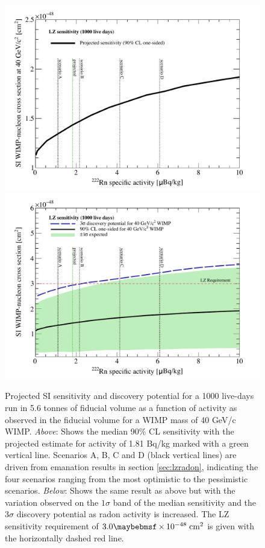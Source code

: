 {%
\begin{figure}[H!]
    \centering
    \vspace{-1cm}
    \includegraphics[scale=0.68]{Chapter_5/Figures/sensitivity_studies/radon_sensitivity.pdf}
    \includegraphics[scale=0.68]{Chapter_5/Figures/sensitivity_studies/radon_sensitivity_discovery.pdf}
    \caption[Projected SI sensitivity and discovery potential for a 1000 live-days run in 5.6 tonnes of fiducial volume as a function of \RnTTT{} activity as observed in the fiducial volume for a WIMP mass of 40 GeV/c\squared{} WIMP.]%
    {Projected SI sensitivity and discovery potential for a 1000 live-days run in 5.6 tonnes of fiducial volume as a function of \RnTTT{} activity as observed in the fiducial volume for a WIMP mass of 40 GeV/c\squared{} WIMP. \textit{Above}: Shows the median 90\% CL sensitivity with the projected estimate for \RnTTT{} activity of 1.81 \micro{}Bq/kg marked with a green vertical line. Scenarios A, B, C and D (black vertical lines) are driven from emanation results in section \ref{sec:lzradon}, indicating the four scenarios ranging from the most optimistic to the pessimistic scenarios. \textit{Below}: Shows the same result as above but with the variation observed on the $1\sigma$ band of the median sensitivity and the $3\sigma$ discovery potential as radon activity is increased. The LZ sensitivity requirement of $3.0 \times 10^{-48} \; \MathText{cm}^2$ is given with the horizontally dashed red line.}

\end{figure}}
